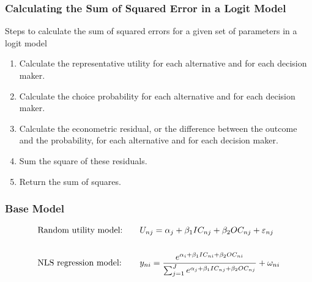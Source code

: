 \documentclass{beamer}\usepackage[]{graphicx}\usepackage[]{color}
\begin{document}
\begin{frame}\frametitle{Calculating the Sum of Squared Error in a Logit Model}
    Steps to calculate the sum of squared errors for a given set of parameters in a logit model
    \begin{enumerate}
        \item Calculate the representative utility for each alternative and for each decision maker.
        \item Calculate the choice probability for each alternative and for each decision maker.
        \item Calculate the econometric residual, or the difference between the outcome and the probability, for each alternative and for each decision maker.
        \item Sum the square of these residuals.
        \item Return the sum of squares.
    \end{enumerate}
\end{frame}

\begin{frame}\frametitle{Base Model}
    \begin{alignat*}{2}
    &\text{Random utility model:} \quad &&U_{nj} = \alpha_j + \beta_1 IC_{nj} + \beta_2 OC_{nj} + \varepsilon_{nj} \\
    \intertext{}
    &\text{NLS regression model:} \quad &&y_{ni} =  \frac{e^{\alpha_i + \beta_1 IC_{ni} + \beta_2 OC_{ni}}}{\sum_{j = 1}^J e^{\alpha_j + \beta_1 IC_{nj} + \beta_2 OC_{nj}}} + \omega_{ni}
    \end{alignat*}
\end{frame}
\end{document}
